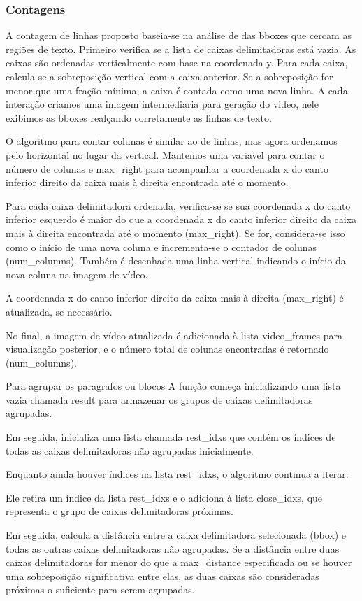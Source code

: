\documentclass[english, 
               brazil, 
               bsc] %
               {dcomp-abntex2}
\begin{document}
\subsubsection{Contagens}
A contagem de linhas proposto baseia-se na análise de das bboxes que cercam as regiões de texto.
Primeiro verifica se a lista de caixas delimitadoras está vazia. As caixas são ordenadas verticalmente com base na coordenada y. Para cada caixa, calcula-se a sobreposição vertical com a caixa anterior. Se a sobreposição for menor que uma fração mínima, a caixa é contada como uma nova linha. A cada interação criamos uma imagem intermediaria para geração do video, nele exibimos as bboxes realçando corretamente as linhas de texto.

O algoritmo para contar colunas é similar ao de linhas, mas agora ordenamos pelo horizontal no lugar da vertical.
Mantemos uma variavel para contar o número de colunas e max\_right para acompanhar a coordenada x do canto inferior direito da caixa mais à direita encontrada até o momento.

Para cada caixa delimitadora ordenada, verifica-se se sua coordenada x do canto inferior esquerdo é maior do que a coordenada x do canto inferior direito da caixa mais à direita encontrada até o momento (max\_right). Se for, considera-se isso como o início de uma nova coluna e incrementa-se o contador de colunas (num\_columns). Também é desenhada uma linha vertical indicando o início da nova coluna na imagem de vídeo.

A coordenada x do canto inferior direito da caixa mais à direita (max\_right) é atualizada, se necessário.

No final, a imagem de vídeo atualizada é adicionada à lista video\_frames para visualização posterior, e o número total de colunas encontradas é retornado (num\_columns).


Para agrupar os paragrafos ou blocos A função começa inicializando uma lista vazia chamada result para armazenar os grupos de caixas delimitadoras agrupadas.

Em seguida, inicializa uma lista chamada rest\_idxs que contém os índices de todas as caixas delimitadoras não agrupadas inicialmente.

Enquanto ainda houver índices na lista rest\_idxs, o algoritmo continua a iterar:

Ele retira um índice da lista rest\_idxs e o adiciona à lista close\_idxs, que representa o grupo de caixas delimitadoras próximas.

Em seguida, calcula a distância entre a caixa delimitadora selecionada (bbox) e todas as outras caixas delimitadoras não agrupadas. Se a distância entre duas caixas delimitadoras for menor do que a max\_distance especificada ou se houver uma sobreposição significativa entre elas, as duas caixas são consideradas próximas o suficiente para serem agrupadas.
\end{document}
